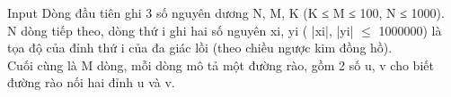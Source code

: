 Input
Dòng đầu tiên ghi 3 số nguyên dương N, M, K (K ≤ M ≤ 100, N ≤ 1000).   
\\   N dòng tiếp theo, dòng thứ i ghi hai số nguyên xi, yi ( |xi|, |yi|  $\le$  1000000) là tọa độ của đỉnh thứ i của đa giác lồi (theo chiều ngược kim đồng hồ).   
\\   Cuối cùng là M dòng, mỗi dòng mô tả một đường rào, gồm 2 số u, v cho biết đường rào nối hai đỉnh u và v.